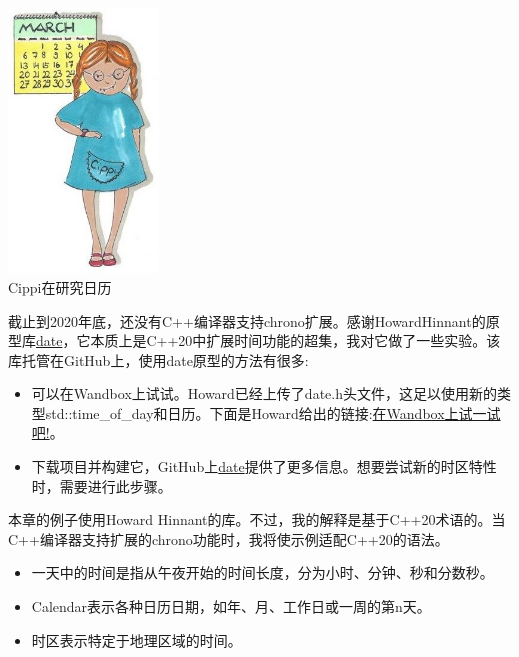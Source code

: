 \begin{center}
\includegraphics[width=0.3\textwidth]{content/3/chapter5/images/18.png}\\
Cippi在研究日历
\end{center}

\begin{tcolorbox}[breakable,enhanced jigsaw,colback=blue!5!white,colframe=blue!75!black,title={缺少编译器支持}]
	
截止到2020年底，还没有C++编译器支持chrono扩展。感谢HowardHinnant的原型库\href{https://github.com/HowardHinnant/date}{date}，它本质上是C++20中扩展时间功能的超集，我对它做了一些实验。该库托管在GitHub上，使用date原型的方法有很多:

\begin{itemize}
\item 
可以在Wandbox上试试。Howard已经上传了date.h头文件，这足以使用新的类型std::time\_of\_day和日历。下面是Howard给出的链接:\href{https://wandbox.org/permlink/L8MwjzSSC3fXXrMd}{在Wandbox上试一试吧!}。

\item 
下载项目并构建它，GitHub上\href{https://github.com/HowardHinnant/date}{date}提供了更多信息。想要尝试新的时区特性时，需要进行此步骤。
\end{itemize}

本章的例子使用Howard Hinnant的库。不过，我的解释是基于C++20术语的。当C++编译器支持扩展的chrono功能时，我将使示例适配C++20的语法。

\end{tcolorbox}

\begin{itemize}
\item 
一天中的时间是指从午夜开始的时间长度，分为小时、分钟、秒和分数秒。

\item 
Calendar表示各种日历日期，如年、月、工作日或一周的第n天。

\item 
时区表示特定于地理区域的时间。
\end{itemize}

